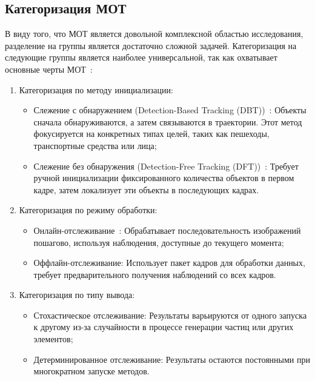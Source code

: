 \subsection{Категоризация МОТ}

В виду того, что МОТ является довольной комплексной областью исследования, разделение на группы является достаточно сложной задачей. Категоризация на следующие группы является наиболее универсальной, так как охватывает основные черты МОТ~\cite{Article::Luo2021}: 

\begin{enumerate}

	\item Категоризация по методу инициализации: 
		
	\begin{itemize}
		
		\item Слежение с обнаружением (Detection-Based Tracking (DBT))~\cite{Bose2007, Song2010}: Объекты сначала обнаруживаются, а затем связываются в траектории. Этот метод фокусируется на конкретных типах целей, таких как пешеходы, транспортные средства или лица;
		
		\item Слежение без обнаружения (Detection-Free Tracking (DFT))~\cite{Zhang2013}: Требует ручной инициализации фиксированного количества объектов в первом кадре, затем локализует эти объекты в последующих кадрах.
	
	\end{itemize}
	
	\item Категоризация по режиму обработки:
	
	\begin{itemize}
		
		\item Онлайн-отслеживание~\cite{Xiang2015}: Обрабатывает последовательность изображений пошагово, используя наблюдения, доступные до текущего момента;
		
		\item Оффлайн-отслеживание: Использует пакет кадров для обработки данных, требует предварительного получения наблюдений со всех кадров.
		
	\end{itemize}
	
	\item Категоризация по типу вывода:
	
	\begin{itemize}
		
		\item Стохастическое отслеживание: Результаты варьируются от одного запуска к другому из-за случайности в процессе генерации частиц или других элементов;
		
		\item Детерминированное отслеживание: Результаты остаются постоянными при многократном запуске методов.
		
	\end{itemize}
	
\end{enumerate}

